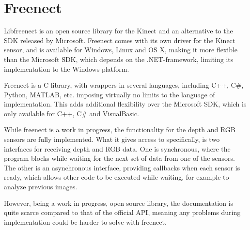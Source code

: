 \section{Freenect}

Libfreenect\cite{libfreenect} is an open source library for the Kinect and an alternative to the SDK released
by Microsoft. Freenect comes with its own driver for the Kinect sensor, and is available for Windows, Linux
and OS X, making it more flexible than the Microsoft SDK, which depends on the
.NET-framework\cite{kinectwindows},
limiting its implementation to the Windows platform.

Freenect is a C library, with wrappers in several languages, including C++, C\#, Python, MATLAB, etc.
imposing virtually no limits to the language of implementation. This adds additional flexibility over
the Microsoft SDK, which is only available for C++, C\# and VisualBasic.

While freenect is a work in progress, the functionality for the depth and RGB sensors are fully implemented.
What it gives access to specifically, is two interfaces for receiving depth and RGB data. One is synchronous, 
where the program blocks while waiting for the next set of data from one of the sensors. The other is an 
asynchronous interface, providing callbacks when each sensor is ready, which allows other code to be executed
while waiting, for example to analyze previous images.

However, being a work in progress, open source library, the documentation is quite scarce compared to
that of the official API, meaning any problems during implementation could be harder to solve with freenect.
